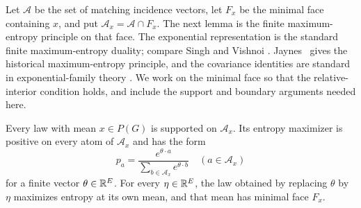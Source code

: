 Let $\mathcal A$ be the set of matching incidence vectors, let $F_x$ be
the minimal face containing $x$, and put $\mathcal A_x=\mathcal A\cap F_x$.
The next lemma is the finite maximum-entropy principle on that face.
The exponential representation is the standard finite maximum-entropy
duality; compare Singh and Vishnoi
\citep[full version, Definition~2.1 and Lemma~2.3]{SinghVishnoi2014}.
Jaynes~\citep{Jaynes1957} gives the historical maximum-entropy principle,
and the covariance identities are standard in exponential-family theory
\citep[Proposition~3.1]{WainwrightJordan2008}. We work on the minimal face so that the
relative-interior condition holds, and include the support and boundary
arguments needed here.

\begin{lemma}\label{ent:exponential}
Every law with mean $x\in P(G)$ is supported on $\mathcal A_x$.
Its entropy maximizer is positive on every atom of $\mathcal A_x$ and has
the form
\begin{equation}\label{ent:gibbs}
 p_a=\frac{e^{\theta\cdot a}}{\sum_{b\in\mathcal A_x}e^{\theta\cdot b}}
 \quad(a\in\mathcal A_x)
\end{equation}
for a finite vector $\theta\in\mathbb R^E$.
For every $\eta\in\mathbb R^E$, the law obtained by replacing $\theta$ by $\eta$
maximizes entropy at its own mean, and that mean has minimal face $F_x$.
\end{lemma}

